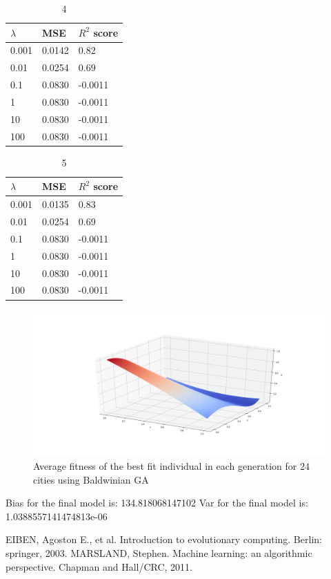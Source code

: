 \documentclass [11pt]{article}
\begin{document}
\begin{table}[]
\centering
\begin{tabular}{lll}
\hline
$\lambda$ & MSE    & $R^{2}$ score \\ \hline
0.001     & 0.0142 & 0.82          \\
0.01      & 0.0254 & 0.69          \\
0.1       & 0.0830 & -0.0011       \\
1         & 0.0830 & -0.0011       \\
10        & 0.0830 & -0.0011       \\
100       & 0.0830 & -0.0011       \\ \hline
\end{tabular}
\caption{4}
\label{my-label}
\end{table}

\begin{table}[]
\centering
\begin{tabular}{lll}
\hline
$\lambda$ & MSE    & $R^{2}$ score \\ \hline
0.001     & 0.0135 & 0.83          \\
0.01      & 0.0254 & 0.69          \\
0.1       & 0.0830 & -0.0011       \\
1         & 0.0830 & -0.0011       \\
10        & 0.0830 & -0.0011       \\
100       & 0.0830 & -0.0011       \\ \hline
\end{tabular}
\caption{5}
\label{my-label}
\end{table}

\begin{figure}[H]
\centering
\includegraphics[width=1\textwidth]{figures/LassoFranke.png}
        \caption{Average fitness of the best fit individual in each generation for $24$ cities using Baldwinian GA}
        \label{fig:LassoFranke}
\end{figure}

Bias for the final model is: 134.818068147102
Var for the final model is: 1.0388557141474813e-06
\begin{thebibliography}{111}
\raggedright
{} EIBEN, Agoston E., et al. Introduction to evolutionary computing. Berlin: springer, 2003.
 MARSLAND, Stephen. Machine learning: an algorithmic perspective. Chapman and Hall/CRC, 2011.

\end{thebibliography}
\end{document}
